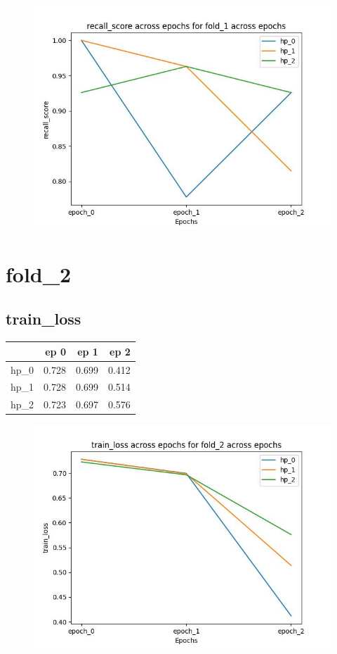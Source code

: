 \documentclass{article}
\begin{document}
\begin{figure}[H]
\includegraphics[scale = 0.75]{fold_1/recall_score}
\end{figure}
\section{fold\_2}
\subsection{train\_loss}
\begin{tabular}{lrrr}
\toprule
{} &   ep 0 &   ep 1 &   ep 2 \\
\midrule
hp\_0 &  0.728 &  0.699 &  0.412 \\
hp\_1 &  0.728 &  0.699 &  0.514 \\
hp\_2 &  0.723 &  0.697 &  0.576 \\
\bottomrule
\end{tabular}

\begin{figure}[H]
\includegraphics[scale = 0.75]{fold_2/train_loss}
\end{figure}
\end{document}
